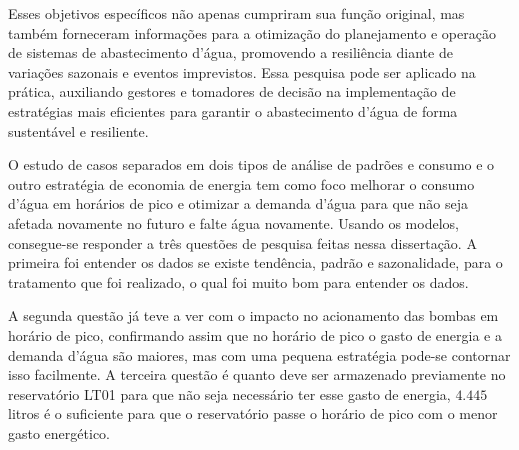 Esses objetivos específicos não apenas cumpriram sua função original, mas também forneceram informações para a otimização do planejamento e operação de sistemas de abastecimento d'água, promovendo a resiliência diante de variações sazonais e eventos imprevistos. Essa pesquisa pode ser aplicado na prática, auxiliando gestores e tomadores de decisão na implementação de estratégias mais eficientes para garantir o abastecimento d'água de forma sustentável e resiliente.

O estudo de casos separados em dois tipos de análise de padrões e consumo e o outro estratégia de economia de energia tem como foco melhorar o consumo d'água em horários de pico e otimizar a demanda d'água para que não seja afetada novamente no futuro e falte água novamente. Usando os modelos, consegue-se responder a três questões de pesquisa feitas nessa dissertação. A primeira foi entender os dados se existe tendência, padrão e sazonalidade, para o tratamento que foi realizado, o qual foi muito bom para entender os dados.

A segunda questão já teve a ver com o impacto no acionamento das bombas em horário de pico, confirmando assim que no horário de pico o gasto de energia e a demanda d'água são maiores, mas com uma pequena estratégia pode-se contornar isso facilmente. A terceira questão é quanto deve ser armazenado previamente no reservatório LT01 para que não seja necessário ter esse gasto de energia, $4.445$ litros é o suficiente para que o reservatório passe o horário de pico com o menor gasto energético.

 


